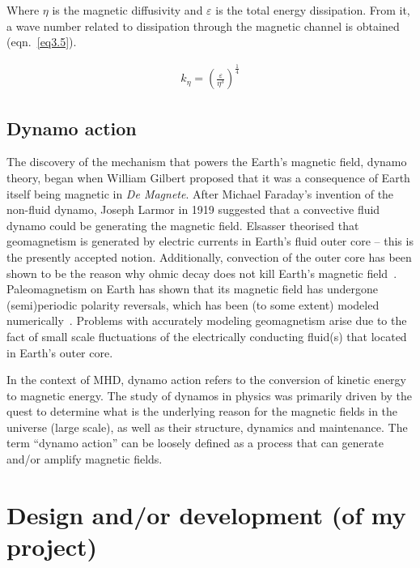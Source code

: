 \documentclass[12pt,a4paper]{report}
\begin{document}
Where $\eta$ is the magnetic diffusivity and $\varepsilon$ is the total energy dissipation. From it, a wave number related to dissipation through the magnetic channel is obtained (eqn.~\ref{eq3.5}).

\begin{align}
 k_\eta = \left( \frac{\varepsilon}{\eta^3} \right)^{\frac{1}{4}} \label{eq3.5}
\end{align}

\section{Dynamo action}

The discovery of the mechanism that powers the Earth's magnetic field, dynamo theory, began when William Gilbert proposed that it was a consequence of Earth itself being magnetic in \textit{De Magnete}. After Michael Faraday's invention of the non-fluid dynamo, Joseph Larmor in 1919 suggested that a convective fluid dynamo could be generating the magnetic field. Elsasser theorised that geomagnetism is generated by electric currents in Earth's fluid outer core -- this is the presently accepted notion. Additionally, convection of the outer core has been shown to be the reason why ohmic decay does not kill Earth's magnetic field~\cite{stern2002millennium}. Paleomagnetism on Earth has shown that its magnetic field has undergone (semi)periodic polarity reversals, which has been (to some extent) modeled numerically~\cite{glatzmaier1995three}. Problems with accurately modeling geomagnetism arise due to the fact of small scale fluctuations of the electrically conducting fluid(s) that located in Earth's outer core.

In the context of MHD, dynamo action refers to the conversion of kinetic energy to magnetic energy. The study of dynamos in physics was primarily driven by the quest to determine what is the underlying reason for the magnetic fields in the universe (large scale), as well as their structure, dynamics and maintenance. The term ``dynamo action'' can be loosely defined as a process that can generate and/or amplify magnetic fields. 

















\chapter{Design and/or development (of my project)}
\end{document}
